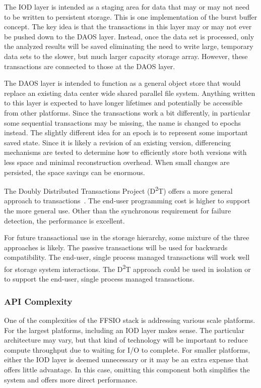 The IOD layer is intended as a staging area for data that may or may not need
to be written to persistent storage. This is one implementation of the burst
buffer concept. The key idea is that the transactions in this layer may or may
not ever be pushed down to the DAOS layer. Instead, once the data set is
processed, only the analyzed results will be saved eliminating the need to
write large, temporary data sets to the slower, but much larger capacity
storage array. However, these transactions are connected to those at the DAOS
layer.

The DAOS layer is intended to function as a general object store that would
replace an existing data center wide shared parallel file system. Anything
written to this layer is expected to have longer lifetimes and potentially be
accessible from other platforms. Since the transactions work a bit differently,
in particular some sequential transactions may be missing, the name is changed
to epochs instead. The slightly different idea for an epoch is to represent
some important saved state. Since it is likely a revision of an existing
version, differencing mechanisms are tested to determine how to efficiently
store both versions with less space and minimal reconstruction overhead. When
small changes are persisted, the space savings can be enormous.

The Doubly Distributed Transactions Project ({D\textsuperscript{2}T}) offers a
more general approach to
transactions~\cite{lofstead:2012:txn,lofstead:2014:txn}. The end-user
programming cost is higher to support the more general use. Other than the
synchronous requirement for failure detection, the performance is excellent.

For future transactional use in the storage hierarchy, some mixture of the
three approaches is likely. The passive transactions will be used for backwards
compatibility. The end-user, single process managed transactions will work well
for storage system interactions. The {D\textsuperscript{2}T} approach could be used in isolation or
to support the end-user, single process managed transactions.

\subsubsection{API Complexity}
One of the complexities of the FFSIO stack is addressing various scale
platforms. For the largest platforms, including an IOD layer makes sense. The
particular architecture may vary, but that kind of technology will be important
to reduce compute throughput due to waiting for I/O to complete. For smaller
platforms, either the IOD layer is deemed unnecessary or it may be an extra
expense that offers little advantage. In this case, omitting this component
both simplifies the system and offers more direct performance.


